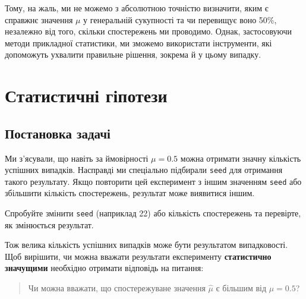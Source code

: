 \documentclass[
  letterpaper,
  10pt,
  openany]{report}
\theoremstyle{definition}
\theoremstyle{remark}
\begin{document}
Тому, на жаль, ми не можемо з абсолютною точністю визначити, яким є
справжнє значення \(\mu\) у генеральній сукупності та чи перевищує воно
50\%, незалежно від того, скільки спостережень ми проводимо. Однак,
застосовуючи методи прикладної статистики, ми зможемо використати
інструменти, які допоможуть ухвалити правильне рішення, зокрема й у
цьому випадку.

\section{Статистичні
гіпотези}\label{ux441ux442ux430ux442ux438ux441ux442ux438ux447ux43dux456-ux433ux456ux43fux43eux442ux435ux437ux438}

\subsection{Постановка
задачі}\label{ux43fux43eux441ux442ux430ux43dux43eux432ux43aux430-ux437ux430ux434ux430ux447ux456}

Ми з'ясували, що навіть за ймовірності \(\mu = 0.5\) можна отримати
значну кількість успішних випадків. Насправді ми спеціально підбирали
\texttt{seed} для отримання такого результату. Якщо повторити цей
експеримент з іншим значенням \texttt{seed} або збільшити кількість
спостережень, результат може виявитися іншим.

\begin{tcolorbox}[enhanced jigsaw, colframe=quarto-callout-tip-color-frame, colback=white, colbacktitle=quarto-callout-tip-color!10!white, opacityback=0, toprule=.15mm, bottomtitle=1mm, toptitle=1mm, leftrule=.75mm, rightrule=.15mm, breakable, opacitybacktitle=0.6, arc=.35mm, titlerule=0mm, coltitle=black, bottomrule=.15mm, left=2mm, title=\textcolor{quarto-callout-tip-color}{\faLightbulb}\hspace{0.5em}{Порада}]

Спробуйте змінити \texttt{seed} (наприклад 22) або кількість
спостережень та перевірте, як змінюється результат.

\end{tcolorbox}

Тож велика кількість успішних випадків може бути результатом
випадковості. Щоб вирішити, чи можна вважати результати експерименту
\textbf{статистично значущими} необхідно отримати відповідь на питання:

\begin{quote}
Чи можна вважати, що спостережуване значення \(\hat{\mu}\) є більшим від
\(\mu = 0.5\)?
\end{quote}
\end{document}
